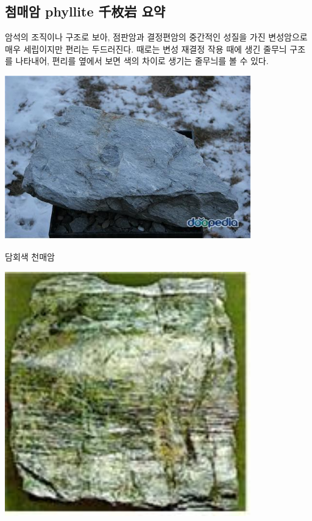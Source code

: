 \documentclass[12pt, a4paper, twoside]{book}
\begin{document}
		\subsection{첨매암 phyllite  千枚岩 요약 }

				암석의 조직이나 구조로 보아, 점판암과 결정편암의 중간적인 성질을 가진 변성암으로 매우 세립이지만 편리는 두드러진다. 
				때로는 변성 재결정 작용 때에 생긴 줄무늬 구조를 나타내어, 편리를 옆에서 보면 색의 차이로 생기는 줄무늬를 볼 수 있다.  


				
				\begin{center}
				\includegraphics[width=0.8\textwidth]{./fig/Phyllite_0002.jpg}
				\end{center}
				담회색 천매암


				\begin{center}
				\includegraphics[width=0.8\textwidth]{./fig/Phyllite_0001.jpg}
				\end{center}
\end{document}
